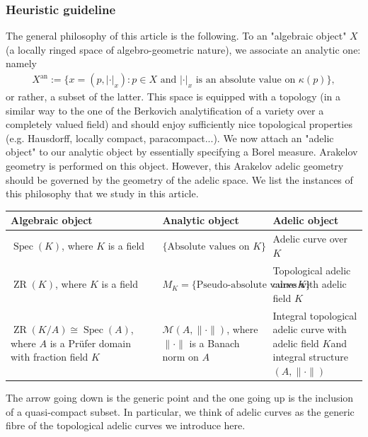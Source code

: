 \documentclass [11pt,reqno]{amsart}
\newcommand{\1}{\mathmybb{1}}
\def\cM{{\mathcal{M}}}
\def\an{\operatorname{an}}
\def\Spec{\operatorname{Spec}}
\def\ZR{\operatorname{ZR}}
\begin{document}
\subsubsection*{Heuristic guideline}
The general philosophy of this article is the following. To an "algebraic object" $X$ (a locally ringed space of algebro-geometric nature), we associate an analytic one: namely
\begin{align*}
X^{\an}:=\{x=(p,|\cdot|_{x}) : p\in X \text{ and }|\cdot|_{x} \text{ is an absolute value on }\kappa(p)\},
\end{align*}
or rather, a subset of the latter. This space is equipped with a topology (in a similar way to the one of the Berkovich analytification of a variety over a completely valued field) and should enjoy sufficiently nice topological properties (e.g. Hausdorff, locally compact, paracompact...). We now attach an "adelic object" to our analytic object by essentially specifying a Borel measure. Arakelov geometry is performed on this object. However, this Arakelov adelic geometry should be governed by the geometry of the adelic space. We list the instances of this philosophy that we study in this article. 

\begin{center}
\begin{tabular}{|*{3}{M|}}
    \hline
     Algebraic object    &    Analytic object  &  Adelic object \\\hline
     $\Spec(K)$, where $K$ is a field   & $\{\text{Absolute values on } K\}$ &  Adelic curve over $K$\\\hline
     $\ZR(K)$, where $K$ is a field   &   $M_{K}=\{\text{Pseudo-absolute values on }K\}$ & Topological adelic curve with adelic field $K$\\\hline
     $\ZR(K/A)\cong\Spec(A)$, where $A$ is a Prüfer domain with fraction field $K$   &   $\cM(A,\|\cdot\|)$, where $\|\cdot\|$ is a Banach norm on $A$ & Integral topological adelic curve with adelic field $K$and integral structure $(A,\|\cdot\|)$\\\hline
  \end{tabular}
  \end{center}
  The arrow going down is the generic point and the one going up is the inclusion of a quasi-compact subset. In particular, we think of adelic curves as the generic fibre of the topological adelic curves we introduce here.
 
\end{document}
